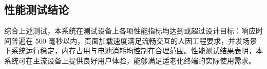 \subsection{性能测试结论}
综合上述测试，本系统在测试设备上各项性能指标均达到或超过设计目标：响应时间普遍在 500 毫秒以内，页面加载速度满足流畅交互的人因工程要求，并发场景下系统运行稳定，内存占用与电池消耗均控制在合理范围。性能测试结果表明，本系统可在主流设备上提供良好用户体验，能够满足适老化终端的实际使用需求。

